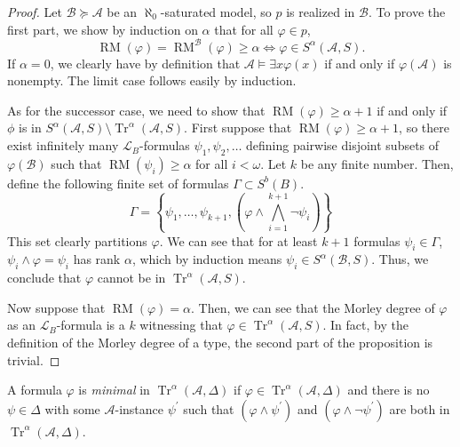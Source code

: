 \documentclass{article}
\DeclareMathOperator{\Tr}{Tr}
\DeclareMathOperator{\RM}{RM}
\let\mc\mathcal
\begin{document}
\begin{proof}
    Let $\mc{B} \succeq \mc{A}$ be an $\aleph_0$-saturated model, so $p$ is realized in $\mc{B}$. To prove the first part, we show by induction on $\alpha$ that for all $\varphi \in p$,
    \[ \RM(\varphi) = \RM^{\mc{B}}(\varphi) \geq \alpha \Leftrightarrow \varphi \in S^{\alpha}(\mc{A}, S). \]
    If $\alpha = 0$, we clearly have by definition that $\mc{A} \vDash \exists x \varphi(x)$ if and only if $\varphi(\mc{A})$ is nonempty. The limit case follows easily by induction.

    As for the successor case, we need to show that $\RM(\varphi) \geq \alpha + 1$ if and only if $\phi$ is in $S^{\alpha}(\mc{A}, S) \setminus \Tr^{\alpha}(\mc{A}, S)$. First suppose that $\RM(\varphi) \geq \alpha + 1$, so there exist infinitely many $\mc{L}_B$-formulas $\psi_1, \psi_2, \ldots$ defining pairwise disjoint subsets of $\varphi(\mc{B})$ such that $\RM(\psi_i) \geq \alpha$ for all $i < \omega$. Let $k$ be any finite number. Then, define the following finite set of formulas $\Gamma \subset S^b(B)$.
    \[ \Gamma = \left\{ \psi_1, \ldots, \psi_{k+1}, \left( \varphi \land \bigwedge_{i=1}^{k+1} \neg \psi_i \right) \right\} \]
    This set clearly partitions $\varphi$. We can see that for at least $k+1$ formulas $\psi_i \in \Gamma$, $\psi_i \land \varphi = \psi_i$ has rank $\alpha$, which by induction means $\psi_i \in S^{\alpha}(\mc{B}, S)$. Thus, we conclude that $\varphi$ cannot be in $\Tr^{\alpha}(\mc{A}, S)$.

    Now suppose that $\RM(\varphi) = \alpha$. Then, we can see that the Morley degree of $\varphi$ as an $\mc{L}_B$-formula is a $k$ witnessing that $\varphi \in \Tr^{\alpha}(\mc{A}, S)$. In fact, by the definition of the Morley degree of a type, the second part of the proposition is trivial.
\end{proof}

\begin{definition}[Minimality]
    A formula $\varphi$ is \textit{minimal} in $\Tr^{\alpha}(\mc{A}, \Delta)$ if $\varphi \in \Tr^{\alpha}(\mc{A}, \Delta)$ and there is no $\psi \in \Delta$ with some $\mc{A}$-instance $\psi^{\prime}$ such that $(\varphi \land \psi^{\prime})$ and $(\varphi \land \neg \psi^{\prime})$ are both in $\Tr^{\alpha}(\mc{A}, \Delta)$.
\end{definition}
\end{document}
